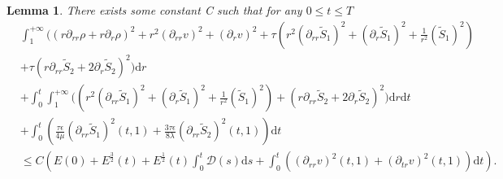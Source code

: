 \documentclass[10pt,reqno]{amsart}
\numberwithin{equation}{section}
\newtheorem{lemma}[theorem]{Lemma}
\begin{document}
	\begin{lemma}\label{lem8}
		There exists some constant C such that for any $0\leq t\leq T$
		\begin{equation}\label{sed-rr}
			\begin{aligned}
				&\int_{1}^{+\infty}\bigg(\left(r\partial_{rr} \rho+r\partial_{r} \rho\right)^2
				+r^2 (\partial_{rr}v)^2+(\partial_{r}v)^2
				+\tau\left(r^2(\partial_{rr}\tilde{S}_1)^2+(\partial_{r}\tilde{S}_1)^2+\frac{1}{ r^2}(\tilde{S}_1)^2\right)\\
				&+\tau\left(r\partial_{rr} \tilde{S}_2+2\partial_{r} \tilde{S}_2\right)^2\bigg)\mathrm{d}r\\
				&+\int_0^t\int_{1}^{+\infty}\bigg(\left(r^2(\partial_{rr}\tilde{S}_1)^2+(\partial_{r}\tilde{S}_1)^2+\frac{1}{ r^2}(\tilde{S}_1)^2\right)
				+\left(r\partial_{rr} \tilde{S}_2+2\partial_{r} \tilde{S}_2\right)^2\bigg)\mathrm{d}r\mathrm{d}t\\
				&
				+\int_{0}^{t}\left(\frac{\tau\epsilon}{4\mu}(\partial_{rr}\tilde{S}_1)^2(t,1)
				+\frac{3\tau\epsilon}{8\lambda}(\partial_{rr}\tilde{S}_2)^2(t,1)\right)\mathrm{d}t\\
				&\leq C \left(E(0)+E^{\frac{3}{2}}(t)+E^{\frac{1}{2}}(t) \int_{0}^{t}\mathcal{D}(s)\mathrm{d}s
				+\int_{0}^{t}((\partial_{rr}v)^2(t,1)+(\partial_{tr}v)^2(t,1))\mathrm{d}t\right).
				\\ 
			\end{aligned}
		\end{equation}
	\end{lemma}
\end{document}
